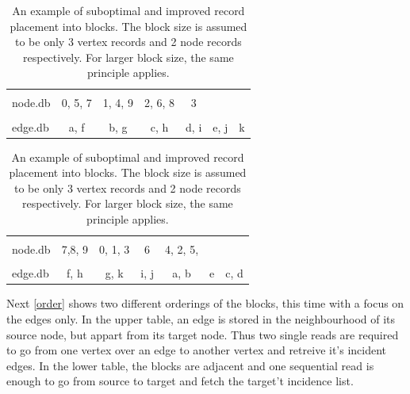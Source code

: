   
     \begin{table}[htp]
     \centering
    \begin{tabular}[c]{|l|c|c|c|c|c|c|} \hline
    &&&&&&\\[-1em]
     node.db & \colorbox{blue!30}{0}, \colorbox{red!30}{5}, \colorbox{green!30}{7} & \colorbox{blue!30}{1}, \colorbox{blue!30}{4}, \colorbox{green!30}{9} & \colorbox{blue!30}{2}, \colorbox{red!30}{6}, \colorbox{green!30}{8} & \colorbox{blue!30}{3} &  & \\ \hline
     &&&&&&\\[-1em]
     edge.db & \colorbox{blue!30}{a}, \colorbox{green!30}{f} & \colorbox{blue!30}{b}, \colorbox{green!30}{g} & \colorbox{blue!30}{c}, \colorbox{green!30}{h} & \colorbox{blue!30}{d}, \colorbox{green!30}{i} & \colorbox{red!30}{e}, \colorbox{green!30}{j} & \colorbox{green!30}{k} \\  \hline
    \end{tabular}
    \vspace{0.5cm}
    
    \begin{tabular}{|l | c | c | c | c | c | c|} \hline
    &&&&&&\\[-1em]
     node.db & \colorbox{green!30}{7},\colorbox{green!30}{8}, \colorbox{green!30}{9} & \colorbox{blue!30}{0}, \colorbox{blue!30}{1}, \colorbox{blue!30}{3} & \colorbox{red!30}{6} & \colorbox{blue!30}{4}, \colorbox{blue!30}{2}, \colorbox{red!30}{5},  &  & \\ \hline
     &&&&&&\\[-1em]
     edge.db &  \colorbox{green!30}{f}, \colorbox{green!30}{h} & \colorbox{green!30}{g}, \colorbox{green!30}{k} & \colorbox{green!30}{i}, \colorbox{green!30}{j} & \colorbox{blue!30}{a}, \colorbox{blue!30}{b} & \colorbox{red!30}{e} & \colorbox{blue!30}{c}, \colorbox{blue!30}{d} \\ \hline
    \end{tabular}
  \caption{An example of suboptimal and improved record placement into blocks. 
  The block size is assumed to be only 3 vertex records and 2 node records respectively. 
  For larger block size, the same principle applies.}
   \label{blocks}
   \end{table}
    
  Next \ref{order} shows two different orderings of the blocks, this time with a focus on the edges only. 
  In the upper table, an edge is stored in the neighbourhood of its source node, but appart from its target node.
  Thus two single reads are required to go from one vertex over an edge to another vertex and retreive it's incident edges. 
  In the lower table, the blocks are adjacent and one sequential read  is enough to go from source to target and fetch the target't incidence list.
  
